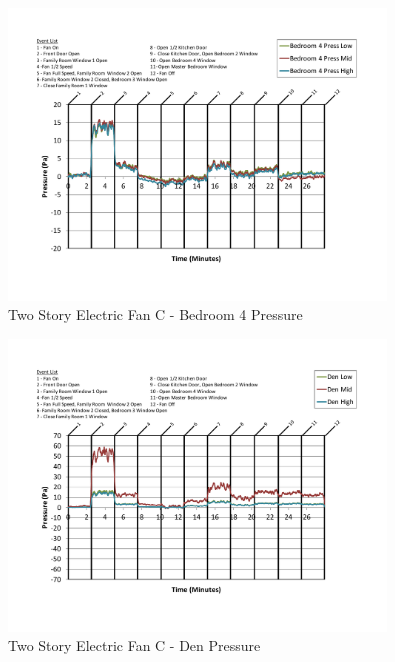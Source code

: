 \documentclass{article}
\begin{document}
\begin{appendices}
	\begin{figure}[H]
		\centering
		\includegraphics[height=3.05in,trim=0.67in 1.1in 0.67in 0.8in,clip=true]{0_Images/Results_Charts/ColdFlow/Two_Story/Electric/C/Bedroom_4_Pressure.pdf}
		\caption{Two Story Electric Fan C - Bedroom 4 Pressure}
	\end{figure}
 

	\begin{figure}[H]
		\centering
		\includegraphics[height=3.05in,trim=0.67in 1.1in 0.67in 0.8in,clip=true]{0_Images/Results_Charts/ColdFlow/Two_Story/Electric/C/Den_Pressure.pdf}
		\caption{Two Story Electric Fan C - Den Pressure}
	\end{figure}
 
	\clearpage


\end{appendices}
\end{document}
